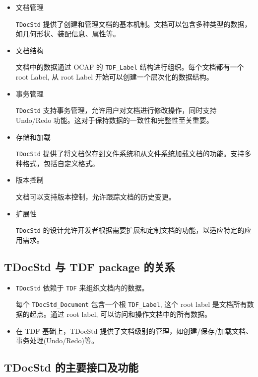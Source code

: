 \documentclass[11pt]{article}
\begin{document}
\begin{itemize}
\item 文档管理

\texttt{TDocStd} 提供了创建和管理文档的基本机制。文档可以包含多种类型的数据，如几何形状、装配信息、属性等。

\item 文档结构

文档中的数据通过 OCAF 的 \texttt{TDF\_Label} 结构进行组织。每个文档都有一个 root Label, 从 root Label 开始可以创建一个层次化的数据结构。

\item 事务管理

\texttt{TDocStd} 支持事务管理，允许用户对文档进行修改操作，同时支持 Undo/Redo 功能。这对于保持数据的一致性和完整性至关重要。

\item 存储和加载

\texttt{TDocStd} 提供了将文档保存到文件系统和从文件系统加载文档的功能。支持多种格式，包括自定义格式。

\item 版本控制

文档可以支持版本控制，允许跟踪文档的历史变更。

\item 扩展性

\texttt{TDocStd} 的设计允许开发者根据需要扩展和定制文档的功能，以适应特定的应用需求。
\end{itemize}
\subsection{TDocStd 与 TDF package 的关系}
\label{sec:org789d503}

\begin{itemize}
\item \texttt{TDocStd} 依赖于 \texttt{TDF} 来组织文档内的数据。

每个 \texttt{TDocStd\_Document} 包含一个根 \texttt{TDF\_Label}, 这个 root label 是文档所有数据的起点。通过 root label, 可以访问和操作文档中的所有数据。

\item 在 TDF 基础上，TDocStd 提供了文档级别的管理，如创建/保存/加载文档、事务处理(Undo/Redo)等。
\end{itemize}
\subsection{TDocStd 的主要接口及功能}
\label{sec:org01dbc11}
\end{document}

